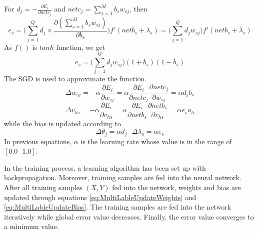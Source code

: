For $d_{j} = - \frac{\partial E_{i}}{\partial netc_{j}}$ and $netc_{j} = \sum_{s=1}^M b_{s}w_{sj}$, then 
\begin{equation}\label{eq:MultiLableGenErrEs}
e_{s} = \big( \sum_{j=1}^Q d_{j} \times \frac{\partial (\sum_{s=1}^M b_{s}w_{sj})}{\partial b_{s}}\big) f'(netb_{s} + \lambda_{s}) = \big( \sum_{j=1}^Q d_{j}w_{sj}\big) f'(netb_{s} + \lambda_{s})
\end{equation}
As $f()$ is $tanh$ function, we get
\begin{equation}\label{eq:MultiLableGenErrEsFin}
e_{s} = \big( \sum_{j=1}^Q d_{j}w_{sj}\big) (1+b_{s})(1-b_{s})
\end{equation}
The SGD is used to approximate the function.
\begin{equation}\label{eq:MultiLableUpdateWeights}
\Delta w_{sj} = -\alpha \frac{\partial E_{i}}{\partial w_{sj}} = \alpha \frac{\partial E_{i}}{\partial netc_{j}} \frac{\partial netc_{j}}{\partial w_{sj}} = \alpha d_{j}b_{s}
\end{equation}
\begin{equation}\label{eq:MultiLableUpdateHidWeights}
\Delta v_{hs} = -\alpha \frac{\partial E_{i}}{\partial v_{hs}} = \alpha \frac{\partial E_{i}}{\partial netb_{s}} \frac{\partial netb_{s}}{\partial v_{hs}} = \alpha e_{s}a_{h}
\end{equation}
while the bias is updated according to
\begin{equation}\label{eq:MultiLableUpdateBias}
\Delta \theta_{j} = \alpha d_{j} \text{ } \Delta \lambda_{s} = \alpha e_{s}
\end{equation}
In previous equations, $\alpha$ is the learning rate whose value is in the range of $[0.0 \text{ } 1.0]$.

In the training process, a learning algorithm has been set up with backpropagation. Moreover, training samples are fed into the neural network. After all training samples $(X, Y)$ fed into the network, weights and bias are updated through equations \ref{eq:MultiLableUpdateWeights} and \ref{eq:MultiLableUpdateBias}. The training samples are fed into the network iteratively while global error value decreases. Finally, the error value converges to a minimum value.

